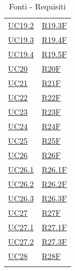 \begin{center}
\begin{longtable}[!h]{m{50px} m{50px}}
        \hyperref[sec:UC19.2]{UC19.2}     & \hyperref[tab:RequisitiFunzionali]{R19.3F} \\
        \hyperref[sec:UC19.3]{UC19.3}     & \hyperref[tab:RequisitiFunzionali]{R19.4F} \\
        \hyperref[sec:UC19.4]{UC19.4}     & \hyperref[tab:RequisitiFunzionali]{R19.5F} \\
        \hyperref[sec:UC20]{UC20}         & \hyperref[tab:RequisitiFunzionali]{R20F}   \\
        \hyperref[sec:UC21]{UC21}         & \hyperref[tab:RequisitiFunzionali]{R21F}   \\
        \hyperref[sec:UC22]{UC22}         & \hyperref[tab:RequisitiFunzionali]{R22F}   \\
        \hyperref[sec:UC23]{UC23}         & \hyperref[tab:RequisitiFunzionali]{R23F}   \\
        \hyperref[sec:UC24]{UC24}         & \hyperref[tab:RequisitiFunzionali]{R24F}   \\
        \hyperref[sec:UC25]{UC25}         & \hyperref[tab:RequisitiFunzionali]{R25F}   \\
        \hyperref[sec:UC26]{UC26}         & \hyperref[tab:RequisitiFunzionali]{R26F}   \\
        \hyperref[sec:UC26.1]{UC26.1}     & \hyperref[tab:RequisitiFunzionali]{R26.1F} \\
        \hyperref[sec:UC26.2]{UC26.2}     & \hyperref[tab:RequisitiFunzionali]{R26.2F} \\
        \hyperref[sec:UC26.3]{UC26.3}     & \hyperref[tab:RequisitiFunzionali]{R26.3F} \\
        \hyperref[sec:UC27]{UC27}         & \hyperref[tab:RequisitiFunzionali]{R27F}   \\
        \hyperref[sec:UC27.1]{UC27.1}     & \hyperref[tab:RequisitiFunzionali]{R27.1F} \\
        \hyperref[sec:UC27.2]{UC27.2}     & \hyperref[tab:RequisitiFunzionali]{R27.3F} \\
        \hyperref[sec:UC28]{UC28}         & \hyperref[tab:RequisitiFunzionali]{R28F}   \\



        \rowcolor{white}\caption{Fonti - Requisiti}
    \end{longtable}
\end{center}
